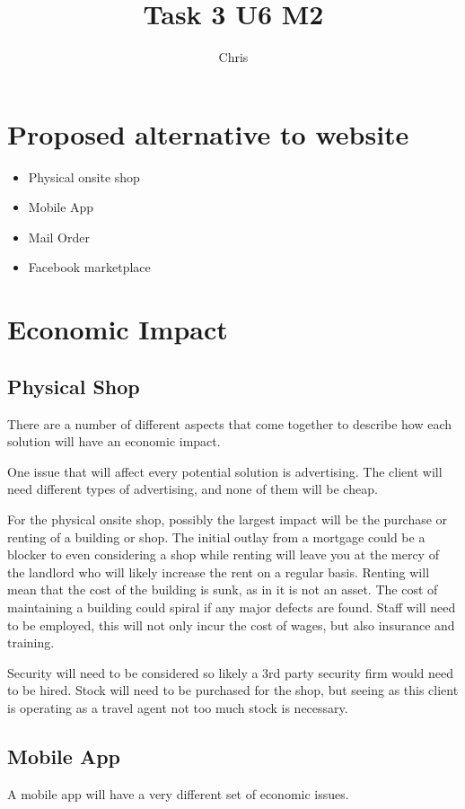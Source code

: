 \documentclass{article}
\title{Task 3 U6 M2}
\author{Chris}
\begin{document}
\maketitle


\section{Proposed alternative to website}
\begin{itemize}
    \item Physical onsite shop
    \item Mobile App
    \item Mail Order
    \item Facebook marketplace
\end{itemize}

\pagebreak
\section{Economic Impact}

\subsection{Physical Shop}
There are a number of different aspects that come together to describe how each solution will have an economic impact.

One issue that will affect every potential solution is advertising. The client will need different types of advertising, and none of them will be cheap.

For the physical onsite shop, possibly the largest impact will be the purchase or renting of a building or shop. The initial outlay from a mortgage could be a blocker to even considering a shop while renting will leave you at the mercy of the landlord who will likely increase the rent on a regular basis. Renting will mean that the cost of the building is sunk, as in it is not an asset. The cost of maintaining a building could spiral if any major defects are found. Staff will need to be employed, this will not only incur the cost of wages, but also insurance and training.


Security will need to be considered so likely a 3rd party security firm would need to be hired.
Stock will need to be purchased for the shop, but seeing as this client is operating as a travel agent not too much stock is necessary.


\subsection{Mobile App}
A mobile app will have a very different set of economic issues.
\end{document}
